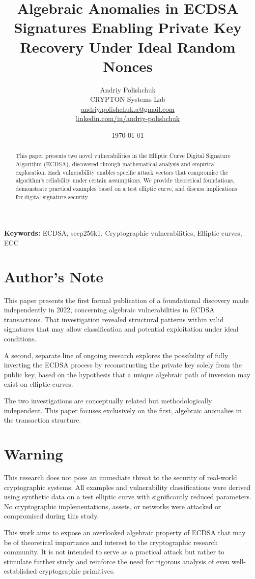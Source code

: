 \documentclass[11pt]{article}
\title{Algebraic Anomalies in ECDSA Signatures Enabling Private Key Recovery Under Ideal Random Nonces}
\author{
  Andriy Polishchuk\\
  CRYPTON Systems Lab\\
  \href{mailto:andriy.polishchuk.a@gmail.com}{andriy.polishchuk.a@gmail.com}\\
  \href{https://www.linkedin.com/in/andriy-polishchuk}{linkedin.com/in/andriy-polishchuk}
}
\date{\today}
\begin{document}
\maketitle

\begin{abstract}
This paper presents two novel vulnerabilities in the Elliptic Curve Digital Signature Algorithm (ECDSA), discovered through mathematical analysis and empirical exploration. Each vulnerability enables specific attack vectors that compromise the algorithm's reliability under certain assumptions. We provide theoretical foundations, demonstrate practical examples based on a test elliptic curve, and discuss implications for digital signature security.
\end{abstract}

\textbf{Keywords:} ECDSA, secp256k1, Cryptographic vulnerabilities, Elliptic curves, ECC

\section*{Author's Note}
This paper presents the first formal publication of a foundational discovery made independently in 2022, concerning algebraic vulnerabilities in ECDSA transactions. That investigation revealed structural patterns within valid signatures that may allow classification and potential exploitation under ideal conditions.

A second, separate line of ongoing research explores the possibility of fully inverting the ECDSA process by reconstructing the private key solely from the public key, based on the hypothesis that a unique algebraic path of inversion may exist on elliptic curves.

The two investigations are conceptually related but methodologically independent. This paper focuses exclusively on the first, algebraic anomalies in the transaction structure.

\section*{Warning}
This research does not pose an immediate threat to the security of real-world cryptographic systems. All examples and vulnerability classifications were derived using synthetic data on a test elliptic curve with significantly reduced parameters. No cryptographic implementations, assets, or networks were attacked or compromised during this study.

This work aims to expose an overlooked algebraic property of ECDSA that may be of theoretical importance and interest to the cryptographic research community. It is not intended to serve as a practical attack but rather to stimulate further study and reinforce the need for rigorous analysis of even well-established cryptographic primitives.
\end{document}
